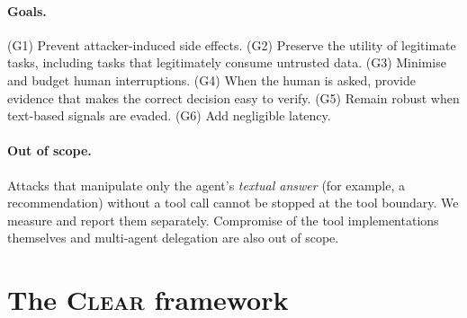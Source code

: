 \documentclass[preprint,12pt,nonatbib]{elsarticle}
\theoremstyle{remark}
\newcommand{\clear}{\textsc{Clear}}
\begin{document}
\paragraph{Goals.}
(G1) Prevent attacker-induced side effects.
(G2) Preserve the utility of legitimate tasks, including tasks that legitimately
consume untrusted data.
(G3) Minimise and budget human interruptions.
(G4) When the human is asked, provide evidence that makes the correct decision
easy to verify.
(G5) Remain robust when text-based signals are evaded.
(G6) Add negligible latency.

\paragraph{Out of scope.} Attacks that manipulate only the agent's \emph{textual
answer} (for example, a recommendation) without a tool call cannot be stopped at
the tool boundary. We measure and report them separately. Compromise of the
tool implementations themselves and multi-agent delegation are also out of
scope.

\section{The \clear{} framework}
\label{sec:framework}
\end{document}
